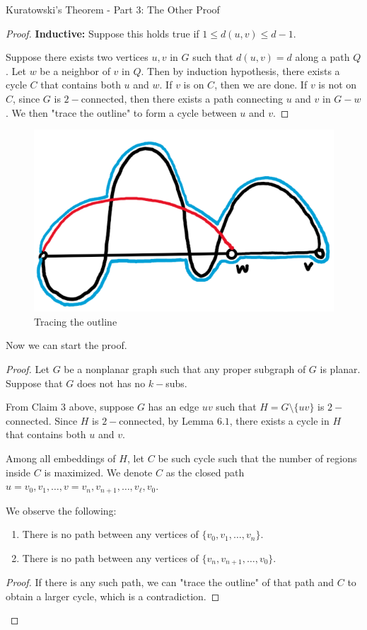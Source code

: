 \documentclass[12pt]{article}
\theoremstyle{definition}
\begin{document}
\begin{section}{Kuratowski's Theorem - Part 3: The Other Proof}
\begin{proof}
\textbf{Inductive:} Suppose this holds true if $1 \le d(u,v) \le d-1$.

Suppose there exists two vertices $u,v$ in $G$ such that $d(u,v) = d$ along a path $Q$. Let $w$ be a neighbor of $v$ in $Q$. Then by induction hypothesis, there exists a cycle $C$ that contains both $u$ and $w$. If $v$ is on $C$, then we are done. If $v$ is not on $C$, since $G$ is $2-$connected, then there exists a path connecting $u$ and $v$ in $G-w$. We then "trace the outline" to form a cycle between $u$ and $v$.
\end{proof}

\begin{figure}[hbt!]
    \centering
    \includegraphics[width=0.5\linewidth]{graphs/trace_outline.png}
    \caption{Tracing the outline}
\end{figure}

\noindent Now we can start the proof.

\begin{proof}

Let $G$ be a nonplanar graph such that any proper subgraph of $G$ is planar. Suppose that $G$ does not has no $k-$subs.

From Claim $3$ above, suppose $G$ has an edge $uv$ such that $ H = G \setminus\{uv\}$ is $2-$connected. Since $H$ is $2-$connected, by Lemma $6.1$, there exists a cycle in $H$ that contains both $u$ and $v$.

Among all embeddings of $H$, let $C$ be such cycle such that the number of regions inside $C$ is maximized. We denote $C$ as the closed path $u = v_0, v_1, \dots, v = v_n, v_{n+1}, \dots, v_\ell, v_0$.

We observe the following:
\begin{enumerate}
\item There is no path between any vertices of $\{ v_0, v_1, \dots, v_n \}$.
\item There is no path between any vertices of $\{ v_n, v_{n+1}, \dots, v_0\}$.
\end{enumerate}

\begin{proof}
  If there is any such path, we can "trace the outline" of that path and $C$ to obtain a larger cycle, which is a contradiction.
\end{proof}


\end{proof}
\end{section}
\end{document}
